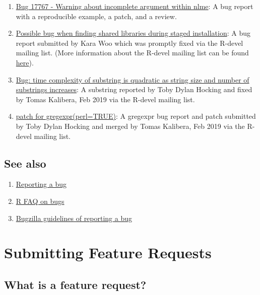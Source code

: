 \documentclass[
]{book}
\begin{document}
\begin{enumerate}
\def\labelenumi{\arabic{enumi}.}
\item
  \href{https://bugs.r-project.org/bugzilla/show_bug.cgi?id=17767}{Bug 17767 - Warning about incomplete argument within nlme}: A bug report with a reproducible example, a patch, and a review.
\item
  \href{https://stat.ethz.ch/pipermail/r-devel/2019-May/077855.html}{Possible bug when finding shared libraries during staged installation}: A bug report submitted by Kara Woo which was promptly fixed via the R-devel mailing list. (More information about the R-devel mailing list can be found \href{https://stat.ethz.ch/mailman/listinfo/r-devel}{here}).
\item
  \href{https://stat.ethz.ch/pipermail/r-devel/2019-February/077393.html}{Bug: time complexity of substring is quadratic as string size and number of substrings increases}: A substring reported by Toby Dylan Hocking and fixed by Tomas Kalibera, Feb 2019 via the R-devel mailing list.
\item
  \href{https://stat.ethz.ch/pipermail/r-devel/2019-February/077315.html}{patch for gregexpr(perl=TRUE)}: A gregexpr bug report and patch submitted by Toby Dylan Hocking and merged by Tomas Kalibera, Feb 2019 via the R-devel mailing list.
\end{enumerate}

\section{See also}\label{see-also-1}

\begin{enumerate}
\def\labelenumi{\arabic{enumi}.}
\item
  \href{https://www.r-project.org/bugs.html}{Reporting a bug}
\item
  \href{https://mac.r-project.org/man/R-FAQ.html\#R-Bugs}{R FAQ on bugs}
\item
  \href{https://bugs.r-project.org/bugzilla/page.cgi?id=bug-writing.html}{Bugzilla guidelines of reporting a bug}
\end{enumerate}

\chapter{Submitting Feature Requests}\label{FeatureRequests}

\section{What is a feature request?}\label{what-is-a-feature-request}
\end{document}
